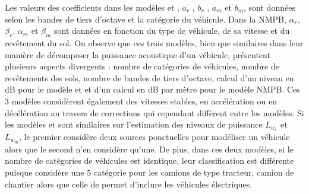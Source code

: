 Les valeurs des coefficients dans les modèles  et , $a_r$ ,  $b_r$ ,  $a_m$  et $b_m$,  sont données selon les bandes de tiers d'octave et la catégorie du véhicule. Dans la NMPB, $\alpha_r$, $\beta_r$, $\alpha_m$ et $\beta_m$ sont données en fonction du type de véhicule, de sa vitesse et du revêtement du sol.
On observe que ces trois modèles, bien que similaires dans leur manière de décomposer la puissance acoustique d'un véhicule, présentent plusieurs aspects divergents : nombre de catégories de véhicules, nombre de revêtements des sols, nombre de bandes de tiers d'octave, calcul d'un niveau en dB pour le modèle  et  et d'un calcul en dB par mètre pour le modèle NMPB. Ces 3 modèles considèrent également des vitesses stables, en accélération ou en décélération au travers de corrections qui cependant diffèrent entre les modèles. Si les modèles  et  sont similaires sur l'estimation des niveaux de puissance $L_{w_r}$ et $L_{w_m}$, le premier considère deux sources ponctuelles pour modéliser un véhicule alors que le second n'en considère qu'une. De plus, dans ces deux modèles, si le nombre de catégories de véhicules est identique, leur classification est différente puisque  considère une 5\ieme{} catégorie pour les camions de type tracteur, camion de chantier alors que celle de  permet d'inclure les véhicules électriques. 

